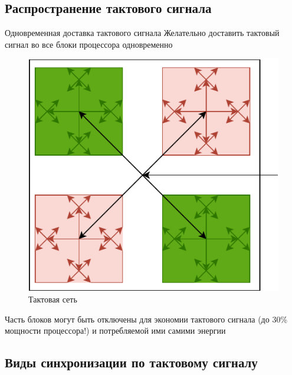 \documentclass[xetex,aspectratio=43]{beamer}
\begin{document}
\subsection{Распространение тактового сигнала}

\begin{frame}{Одновременная доставка тактового сигнала}
    Желательно доставить тактовый сигнал во все блоки процессора одновременно
    \begin{figure}
        \includegraphics[height=0.6\textheight,page=1]{img/05.clocks.drawio-crop.pdf}
        \caption{Тактовая сеть}
    \end{figure}
    \pause
    Часть блоков могут быть отключены для экономии тактового сигнала (до 30\% мощности процессора!)
    и потребляемой ими самими энергии
\end{frame}

\subsection{Виды синхронизации по тактовому сигналу}
\end{document}
